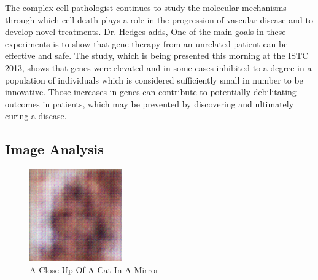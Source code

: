 \documentclass{article}%
\begin{document}
The complex cell pathologist continues to study the molecular mechanisms through which cell death plays a role in the progression of vascular disease and to develop novel treatments.\newline%
Dr. Hedges adds, One of the main goals in these experiments is to show that gene therapy from an unrelated patient can be effective and safe.\newline%
The study, which is being presented this morning at the ISTC 2013, shows that genes were elevated and in some cases inhibited to a degree in a population of individuals which is considered sufficiently small in number to be innovative.\newline%
Those increases in genes can contribute to potentially debilitating outcomes in patients, which may be prevented by discovering and ultimately curing a disease.

%
\subsection{Image Analysis}%
\label{subsec:ImageAnalysis}%


\begin{figure}[h!]%
\centering%
\includegraphics[width=150px]{500_fake_images/samples_5_315.png}%
\caption{A Close Up Of A Cat In A Mirror}%
\end{figure}

%
\end{document}

